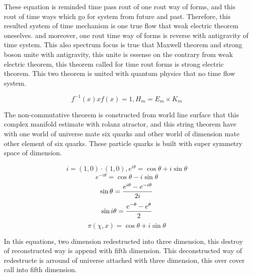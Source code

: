 \documentclass{jsarticle}
\begin{document}
{   These equation is reminded time pass rout of one rout way of forms,
   and this rout of time ways which go for system from future and past.
   Therefore, this resulted system of time mechanism is one true flow
   that weak electric theorem oneselves.
   and moreover, one rout time way of forms is reverse with antigravity of
   time system. This also spectrum focus is true that Maxwell theorem and
   strong boson unite with antigravity, this unite is essense on the contrary
   from weak electric theorem, this theorem called for time rout forms is
   strong electric theorem.
   This two theorem is united with quantum physics that no time flow system.

   $$ f^{-1}(x)xf(x) = 1,H_m = E_m \times K_m $$


   The non-commutative theorem is constructed from world line surface that
   this complex manifold estimate with rolanz atractor, and this string
   theorem have with one world of universe mate six quarks and other world of
   dimension mate other element of six quarks.
   These particle quarks is built with super symmetry space of dimension.

   $$ i = (1,0)\cdot (1,0), e^{i\theta} = \cos \theta + i \sin \theta $$
   $$ e^{-i \theta} = \cos \theta - i\sin \theta $$
   $$ \sin \theta = {e^{i \theta} - e^{-i \theta} \over 2i} $$
   $$ \sin i \theta = {e^{-\theta} - e^{\theta} \over 2} $$
   $$ \pi (\chi,x) = \cos \theta + i \sin \theta $$

   In this equations, two dimension redestructed into three dimension,
   this destroy of reconstructed way is append with fifth dimension.
   This deconstructed way of redestructe is arround of universe attached
   with three dimension, this over cover call into fifth dimension.

}
\end{document}

